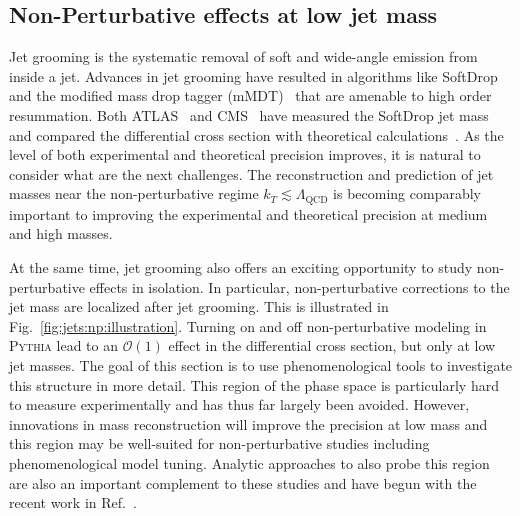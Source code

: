 \documentclass[11pt]{cernrep}
\begin{document}
\subsection{Non-Perturbative effects at low jet mass}
\label{sec:jets:np}

Jet grooming is the systematic removal of soft and wide-angle emission from inside a jet.  Advances in jet grooming have resulted in algorithms like SoftDrop and the modified mass drop tagger (mMDT)~\cite{Larkoski:2014wba,Dasgupta:2013ihk} that are amenable to high order resummation.   Both ATLAS~\cite{Aaboud:2017qwh,Aad:2019vyi} and CMS~\cite{Sirunyan:2018xdh} have measured the SoftDrop jet mass and compared the differential cross section with theoretical calculations~\cite{Frye:2016aiz,Frye:2016okc,Marzani:2017mva,Marzani:2017kqd,Kang:2018vgn,Kang:2018jwa,Baron:2018nfz,Kardos:2018kth}.  As the level of both experimental and theoretical precision improves, it is natural to consider what are the next challenges.  The reconstruction and prediction of jet masses near the non-perturbative regime $k_T\lesssim \Lambda_\text{QCD}$ is becoming comparably important to improving the experimental and theoretical precision at medium and high masses.

At the same time, jet grooming also offers an exciting opportunity to study non-perturbative effects in isolation.  In particular, non-perturbative corrections to the jet mass are localized after jet grooming.  This is illustrated in Fig.~\ref{fig:jets:np:illustration}.  Turning on and off non-perturbative modeling in \textsc{Pythia} lead to an $\mathcal{O}(1)$ effect in the differential cross section, but only at low jet masses.  The goal of this section is to use phenomenological tools to investigate this structure in more detail.  This region of the phase space is particularly hard to measure experimentally and has thus far largely been avoided.  However, innovations in mass reconstruction will improve the precision at low mass and this region may be well-suited for non-perturbative studies including phenomenological model tuning.  Analytic approaches to also probe this region are also an important complement to these studies and have begun with the recent work in Ref.~\cite{Hoang:2019ceu}.
\end{document}
